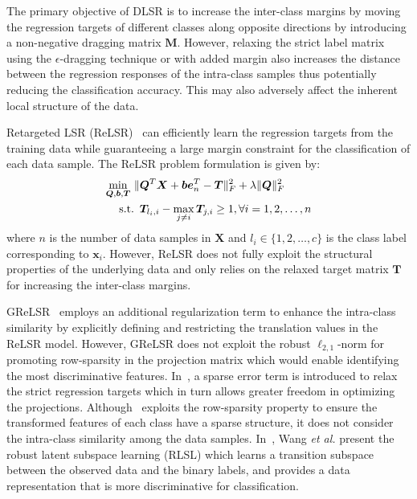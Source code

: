%
The primary objective of DLSR is to increase the inter-class margins by moving the regression targets of different classes along opposite directions by introducing a non-negative dragging matrix $\bm{M}$. However, relaxing the strict label matrix using the $\epsilon$-dragging technique or with added margin also increases the distance between the regression responses of the intra-class samples thus potentially reducing the classification accuracy. This may also adversely affect the inherent local structure of the data. 

Retargeted LSR (ReLSR)~\cite{ReLSR} can efficiently learn the regression targets from the training data while guaranteeing a large margin constraint for the classification of each data sample. The ReLSR problem formulation is given by:
%
\begin{equation}
    \begin{split}
    \label{eq: ReLSR}
    \min_{\bm{Q},\bm{b},\bm{T}} \, \| & \bm{Q}^{T} \bm{X} +  \bm{b} \bm{e}_{n}^{T}  - \bm{T} \|_{F}^{2} + \lambda  \|\bm{Q}\|_{F}^{2}  \\
    \text{s.t.} \enskip & \bm{T}_{l_{i}, i} - \max_{j \neq i} \bm{T}_{j,i} \geq 1, \forall i = 1,2,\dots,n
    \end{split}
\end{equation}
%
where $n$ is the number of data samples in $\bm{X}$ and $l_{i} \in \{ 1,2,\dots, c\}$ is the class label corresponding to $\bm{x}_{i}$. However, ReLSR does not fully exploit the structural properties of the underlying data and only relies on the relaxed target matrix $\bm{T}$ for increasing the inter-class margins. 

GReLSR~\cite{GReLSR} employs an additional regularization term to enhance the intra-class similarity by explicitly defining and restricting the translation values in the ReLSR model. However, GReLSR does not exploit the robust $\ell_{2,1}$-norm for promoting row-sparsity in the projection matrix which would enable identifying the most discriminative features. In~\cite{ICS_DLSR}, a sparse error term is introduced to relax the strict regression targets which in turn allows greater freedom in optimizing the projections. Although~\cite{ICS_DLSR} exploits the row-sparsity property to ensure the transformed features of each class have a sparse structure, it does not consider the intra-class similarity among the data samples. In~\cite{RLSL}, Wang \emph{et al.} present the robust latent subspace learning (RLSL) which learns a transition subspace between the observed data and the binary labels, and provides a data representation that is more discriminative for classification. 
%
